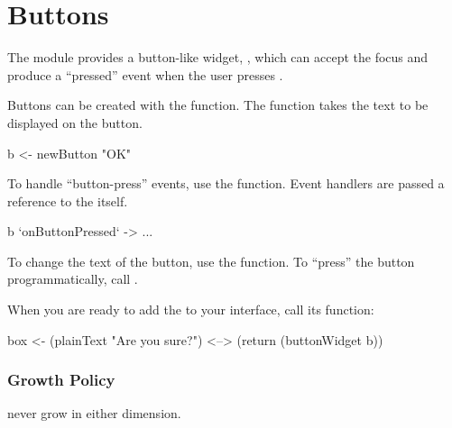 \section{Buttons}

The  module provides a button-like widget, ,
which can accept the focus and produce a ``pressed'' event when the
user presses .

Buttons can be created with the  function.  The function
takes the text to be displayed on the button.

\begin{haskellcode}
 b <- newButton "OK"
\end{haskellcode}

To handle ``button-press'' events, use the 
function.  Event handlers are passed a reference to the 
itself.

\begin{haskellcode}
 b `onButtonPressed` \this ->
   ...
\end{haskellcode}

To change the text of the button, use the  function.
To ``press'' the button programmatically, call .

When you are ready to add the  to your interface, call its
 function:

\begin{haskellcode}
 box <- (plainText "Are you sure?") <--> (return (buttonWidget b))
\end{haskellcode}

\subsubsection{Growth Policy}

 never grow in either dimension.
